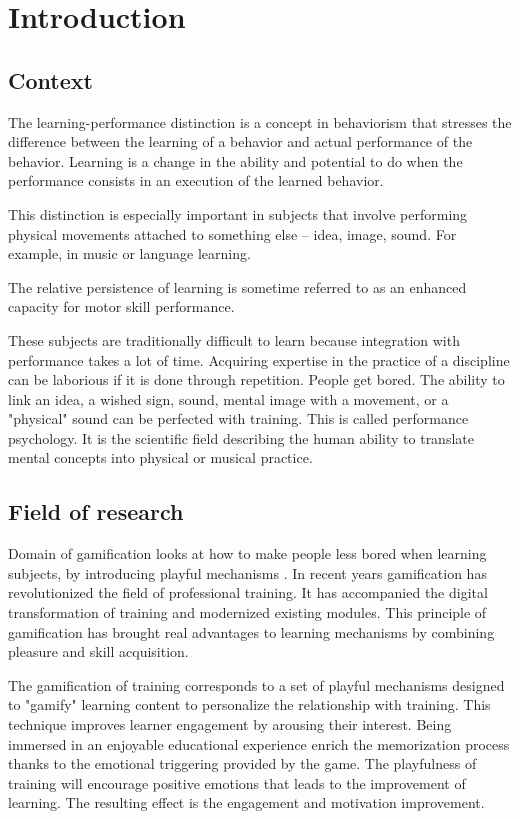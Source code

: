 \chapter{Introduction}

\section{Context}

The learning-performance distinction is a concept in behaviorism that stresses the difference between the learning of a behavior and actual performance of the behavior. Learning is a change in the ability and potential to do when the performance consists in an execution of the learned behavior. \cite{kantak2012learning}

This distinction is especially important in subjects that involve performing physical movements attached to something else – idea, image, sound. For example, in music or language learning.

The relative persistence of learning is sometime referred to as an enhanced capacity for motor skill performance. \cite{kantak2012learning}

These subjects are traditionally difficult to learn because integration with performance takes a lot of time. Acquiring expertise in the practice of a discipline can be laborious if it is done through repetition. People get bored.
The ability to link an idea, a wished sign, sound, mental image with a movement, or a "physical" sound can be perfected with training. This is called performance psychology. It is the scientific field describing the human ability to translate mental concepts into physical or musical practice.

\section{Field of research}

Domain of gamification looks at how to make people less bored when learning subjects, by introducing playful mechanisms \cite[]{saleem2022gamification}.
In recent years gamification has revolutionized the field of professional training. It has accompanied the digital transformation of training and modernized existing modules. This principle of gamification has brought real advantages to learning mechanisms by combining pleasure and skill acquisition.

The gamification of training corresponds to a set of playful mechanisms designed to "gamify" learning content to personalize the relationship with training. This technique improves learner engagement by arousing their interest. Being immersed in an enjoyable educational experience enrich the memorization process thanks to the emotional triggering provided by the game. The playfulness of training will encourage positive emotions that leads to the improvement of learning. The resulting effect is the engagement and motivation improvement.

